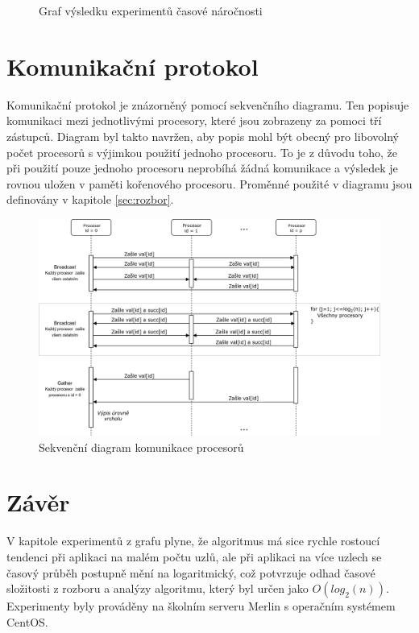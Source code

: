 \documentclass[12pt, a4paper]{article}
\begin{document}
\begin{figure}[H]\centering
	\label{fig:experimenty}
	\caption{Graf výsledku experimentů časové náročnosti}	
\end{figure}

\section{Komunikační protokol}
Komunikační protokol je znázorněný pomocí sekvenčního diagramu. Ten popisuje komunikaci mezi jednotlivými procesory, které jsou zobrazeny za pomoci tří zástupců. Diagram byl takto navržen, aby popis mohl být obecný pro libovolný počet procesorů s výjimkou použití jednoho procesoru. To je z důvodu toho, že při použití pouze jednoho procesoru neprobíhá žádná komunikace a výsledek je rovnou uložen v paměti kořenového procesoru. Proměnné použité v diagramu jsou definovány v kapitole \ref{sec:rozbor}.

\begin{figure}[H]
	\centering
	\includegraphics[scale=0.25]{pics/seq.png}
	\caption{Sekvenční diagram komunikace procesorů}	
\end{figure}


\section{Závěr}
V kapitole experimentů z grafu plyne, že algoritmus má sice rychle rostoucí tendenci při aplikaci na malém počtu uzlů, ale při aplikaci na více uzlech se časový průběh postupně mění na logaritmický, což potvrzuje odhad časové složitosti z rozboru a analýzy algoritmu, který byl určen jako $O(log_{2}(n))$. Experimenty byly prováděny na školním serveru Merlin s operačním systémem CentOS.
\end{document}
